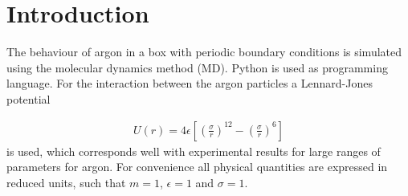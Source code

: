 \section{Introduction}
The behaviour of argon in a box with periodic boundary conditions is simulated using the molecular dynamics method (MD). Python is used as programming language. For the interaction between the argon particles a Lennard-Jones potential

\begin{gather*}
U(r) = 4\epsilon \left[\left(\frac{\sigma}{r}\right)^{12}-\left(\frac{\sigma}{r}\right)^6\right]
\end{gather*}
is used, which corresponds well with experimental results for large ranges of parameters for argon\cite{hoover1970comparison}. For convenience all physical quantities are expressed in reduced units, such that $m=1$, $\epsilon = 1$ and $\sigma = 1$. 

